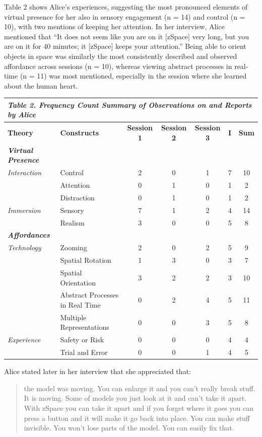 \documentclass[11.5pt]{sig-alternate} %
\begin{document}
\begin{large}
Table 2 shows Alice’s experiences, suggesting the most pronounced elements of virtual presence for her also in sensory engagement (n = 14) and control (n = 10), with two mentions of keeping her attention.  In her interview, Alice mentioned that “It does not seem like you are on it [zSpace] very long, but you are on it for 40 minutes; it [zSpace] keeps your attention.” Being able to orient objects in space was similarly the most consistently described and observed affordance across sessions (n = 10), whereas viewing abstract processes in real-time (n = 11) was most mentioned, especially in the session where she learned about the human heart. 

\begin{table}
\begin{tabular}[h]{llccccc}
\hline
\multicolumn{7}{l}{\textit{\textbf{Table 2.} Frequency Count Summary of Observations on and Reports by Alice}} \\
\hline
\textbf{Theory} & \textbf{Constructs} & \textbf{Session 1} & \textbf{Session 2} & \textbf{Session 3} & \textbf{I} & \textbf{Sum} \\
\hline
\textit{\textbf{Virtual Presence}} & & & & & & \\
\textit{Interaction} & Control & 2 & 0 & 1 & 7 & 10 \\
 & Attention & 0 & 1 & 0 & 1 & 2 \\
 & Distraction & 0 & 1 & 0 & 1 & 2 \\
\textit{Immersion} & Sensory & 7 & 1 & 2 & 4 & 14 \\
 & Realism & 3 & 0 & 0 & 5 & 8 \\
\hline
\textit{\textbf{Affordances}} & & & & & & \\
\textit{Technology} & Zooming & 2 & 0 & 2 & 5 & 9 \\
 & Spatial Rotation & 1 & 3 & 0 & 3 & 7 \\
 & Spatial Orientation & 3 & 2 & 2 & 3 & 10 \\
 & Abstract Processes in Real Time & 0 & 2 & 4 & 5 & 11 \\
 & Multiple Representations & 0 & 0 & 3 & 5 & 8 \\
\textit{Experience} & Safety or Risk & 0 & 0 & 0 & 4 & 4 \\
 & Trial and Error & 0 & 0 & 1 & 4 & 5 \\
\hline
\end{tabular}
\end{table}

Alice stated later in her interview that she appreciated that:
\begin{quote}
    	the model was moving. You can enlarge it and you can’t really break stuff. It is moving. 	Some of models you just look at it and can’t take it apart. With zSpace you can take it 	apart and if you forget where it goes you can press a button and it will make it go back 	into place. You can make stuff invisible. You won’t lose parts of the model. You can 	easily fix that.
\end{quote}


\end{large}
\end{document}
